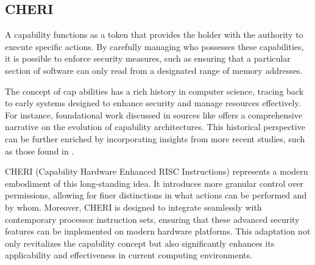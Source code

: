\subsection{CHERI}
A capability functions as a token that provides the holder with the authority to 
execute specific actions. By carefully managing who possesses these capabilities, 
it is possible to enforce security measures, such as ensuring that a particular
section of software can only read from a designated range of memory addresses.

The concept of cap  abilities has a rich history in computer science, tracing 
back to early systems designed to enhance security and manage resources effectively.
For instance, foundational work discussed in sources like \cite{noauthor_capability-based_nodate} offers a comprehensive 
narrative on the evolution of capability architectures. This historical perspective 
can be further enriched by incorporating insights from more recent studies, 
such as those found in \cite{miller_towards_nodate}.

CHERI (Capability Hardware Enhanced RISC Instructions)\cite{woodruff_cheri_2019} represents a modern embodiment of this 
long-standing idea. It introduces more granular control over permissions, allowing for finer 
distinctions in what actions can be performed and by whom. Moreover, CHERI is designed to integrate 
seamlessly with contemporary processor instruction sets, ensuring that these advanced security 
features can be implemented on modern hardware platforms. This adaptation not only revitalizes 
the capability concept but also significantly enhances its applicability and effectiveness 
in current computing environments.